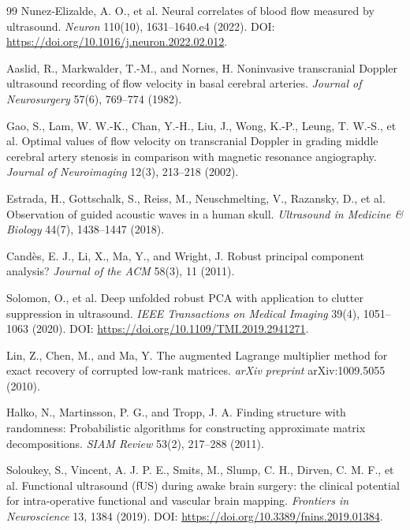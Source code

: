 \documentclass[11pt]{article}
\begin{document}
\begin{thebibliography}{99}
Nunez-Elizalde, A. O., et al.
\newblock Neural correlates of blood flow measured by ultrasound.
\newblock \emph{Neuron} 110(10), 1631--1640.e4 (2022).
\newblock DOI: \url{https://doi.org/10.1016/j.neuron.2022.02.012}.

Aaslid, R., Markwalder, T.-M., and Nornes, H.
\newblock Noninvasive transcranial Doppler ultrasound recording of flow velocity in basal cerebral arteries.
\newblock \emph{Journal of Neurosurgery} 57(6), 769--774 (1982).

Gao, S., Lam, W. W.-K., Chan, Y.-H., Liu, J., Wong, K.-P., Leung, T. W.-S., et al.
\newblock Optimal values of flow velocity on transcranial Doppler in grading middle cerebral artery stenosis in comparison with magnetic resonance angiography.
\newblock \emph{Journal of Neuroimaging} 12(3), 213--218 (2002).

Estrada, H., Gottschalk, S., Reiss, M., Neuschmelting, V., Razansky, D., et al.
\newblock Observation of guided acoustic waves in a human skull.
\newblock \emph{Ultrasound in Medicine \& Biology} 44(7), 1438--1447 (2018).

Cand{\`e}s, E. J., Li, X., Ma, Y., and Wright, J.
\newblock Robust principal component analysis?
\newblock \emph{Journal of the ACM} 58(3), 11 (2011).

Solomon, O., et al.
\newblock Deep unfolded robust PCA with application to clutter suppression in ultrasound.
\newblock \emph{IEEE Transactions on Medical Imaging} 39(4), 1051--1063 (2020).
\newblock DOI: \url{https://doi.org/10.1109/TMI.2019.2941271}.

Lin, Z., Chen, M., and Ma, Y.
\newblock The augmented Lagrange multiplier method for exact recovery of corrupted low-rank matrices.
\newblock \emph{arXiv preprint} arXiv:1009.5055 (2010).

Halko, N., Martinsson, P. G., and Tropp, J. A.
\newblock Finding structure with randomness: Probabilistic algorithms for constructing approximate matrix decompositions.
\newblock \emph{SIAM Review} 53(2), 217--288 (2011).

Soloukey, S., Vincent, A. J. P. E., Smits, M., Slump, C. H., Dirven, C. M. F., et al.
\newblock Functional ultrasound (fUS) during awake brain surgery: the clinical potential for intra-operative functional and vascular brain mapping.
\newblock \emph{Frontiers in Neuroscience} 13, 1384 (2019).
\newblock DOI: \url{https://doi.org/10.3389/fnins.2019.01384}.


\end{thebibliography}
\end{document}
